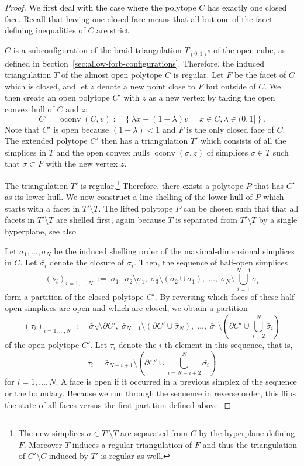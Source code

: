 \documentclass[12pt,reqno]{amsart}
\numberwithin{definition}{section}
\theoremstyle{definition}
\newcommand{\mset}[2]{ \left\{ #1 \; \middle| \; #2 \right\}}
\newcommand{\T}{T} %
\newcommand{\TC}{\T_{(0,1)^n}} %
\begin{document}
\begin{proof} 
We first deal with the case where the polytope $C$ has exactly one closed face. Recall that having one closed face means that all but one of the facet-defining inequalities of $C$ are strict.

$C$ is a subconfiguration of the braid triangulation $\TC$ of the open cube, as defined in Section~\ref{sec:allow-forb-configurations}. Therefore, the induced triangulation $T$ of the almost open polytope $C$ is regular. Let $F$ be the facet of $C$ which is closed, and let $z$ denote a new point close to $F$ but outside of $C$. We then create an open polytope $C'$ with $z$ as a new vertex by taking the open convex hull of $C$ and $z$:
\[
  C' = \operatorname{oconv}(C,v) := \mset{\lambda x + (1-\lambda)v}{x\in C, \lambda\in (0,1] }.
\]
Note that $C'$ is open because $(1-\lambda)<1$ and $F$ is the only closed face of $C$. The extended polytope $C'$ then has a triangulation $T'$ which consists of all the simplices in $T$ and the open convex hulls $\operatorname{oconv}(\sigma,z)$ of simplices $\sigma\in T$ such that $\sigma\subset F$ with the new vertex $z$. 

The triangulation $T'$ is regular.\footnote{The new simplices $\sigma\in T'\setminus T$ are separated from $C$ by the hyperplane defining $F$. Moreover $T$ induces a regular triangulation of $F$ and thus the triangulation of $C'\setminus C$ induced by $T'$ is regular as well.} Therefore, there exists a polytope $P$ that has $C'$ as its lower hull. We now construct a line shelling of the lower hull of $P$ which starts with a facet in $T'\setminus T$. The lifted polytope $P$ can be chosen such that that all facets in $T'\setminus T$ are shelled first, again because $T$ is separated from $T'\setminus T$ by a single hyperplane, see also \cite[Lemma~2]{Breuer2011}.

Let $\sigma_1,\ldots,\sigma_N$ be the induced shelling order of the maximal-dimensional simplices in $C$. Let $\bar{\sigma_i}$ denote the closure of $\sigma_i$. Then, the sequence of half-open simplices
\[
 (\nu_i)_{i=1,\ldots,N}\;  :=\;   \bar{\sigma_1}, \; \bar{\sigma_2}\setminus \bar{\sigma_1}, \; \bar{\sigma_3}\setminus  (\bar{\sigma_2} \cup \bar{\sigma_1}), \; \ldots, \; \bar{\sigma_N} \setminus \bigcup_{i=1}^{N-1} \sigma_i
\]
form a partition of the closed polytope $\bar{C'}$. By reversing which faces of these half-open simplices are open and which are closed, we obtain a partition 
\[
  (\tau_i)_{i=1,\ldots,N}\;  :=\; \bar{\sigma}_N\setminus \partial C' ,\;  \bar{\sigma}_{N-1}\setminus (\partial C' \cup\bar{\sigma}_N),\;  \ldots,\;  \bar{\sigma}_1 \setminus  (\partial C' \cup \bigcup_{i=2}^N \bar{\sigma}_i)
\]
of the open polytope $C'$. Let $\tau_i$ denote the $i$-th element in this sequence, that is, 
\[
  \tau_i = \bar{\sigma}_{N-i+1} \setminus (\partial C' \cup \bigcup_{i=N-i+2}^N \bar{\sigma_i})
\]
for $i=1,\ldots,N$. A face is open if it occurred in a previous simplex of the sequence or the boundary. Because we run through the sequence in reverse order, this flips the state of all faces versus the first partition defined above.


\end{proof}
\end{document}
